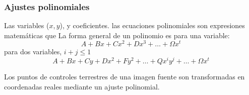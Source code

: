   \subsubsection{Ajustes polinomiales}
  
  Las variables ($x, y$), y coeficientes. 
  las ecuaciones polinomiales son expresiones matemáticas que La forma general de un polinomio es para una variable:
  \begin{equation}
      A + Bx + Cx^2 + Dx^3 +\dots +\Omega x^t
  \end{equation}
  para dos variables, $i+j\leq 1$
  \begin{equation}
      A + Bx + Cy + Dx^2 + Fy^2+\dots + Qx^iy^j +\dots +\Omega x^t
  \end{equation}
  
  Los puntos de controles terrestres de una imagen fuente son 
  transformadas en coordenadas reales mediante un ajuste 
  polinomial.  

